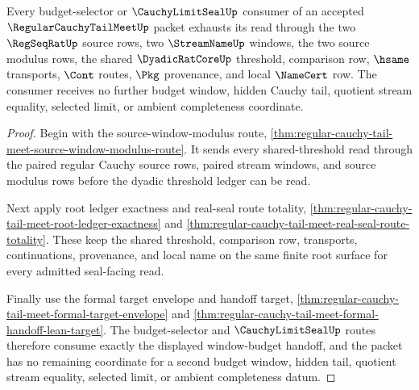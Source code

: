 \begin{theorem}
\label{thm:regular-cauchy-tail-meet-window-budget-exhaustion}
Every budget-selector or $\CauchyLimitSealUp$ consumer of an accepted $\RegularCauchyTailMeetUp$ packet exhausts its read through the two $\RegSeqRatUp$ source rows, two $\StreamNameUp$ windows, the two source modulus rows, the shared $\DyadicRatCoreUp$ threshold, comparison row, $\hsame$ transports, $\Cont$ routes, $\Pkg$ provenance, and local $\NameCert$ row. The consumer receives no further budget window, hidden Cauchy tail, quotient stream equality, selected limit, or ambient completeness coordinate.
\end{theorem}
\begin{proof}
Begin with the source-window-modulus route, \autoref{thm:regular-cauchy-tail-meet-source-window-modulus-route}. It sends every shared-threshold read through the paired regular Cauchy source rows, paired stream windows, and source modulus rows before the dyadic threshold ledger can be read.

Next apply root ledger exactness and real-seal route totality, \autoref{thm:regular-cauchy-tail-meet-root-ledger-exactness} and \autoref{thm:regular-cauchy-tail-meet-real-seal-route-totality}. These keep the shared threshold, comparison row, transports, continuations, provenance, and local name on the same finite root surface for every admitted seal-facing read.

Finally use the formal target envelope and handoff target, \autoref{thm:regular-cauchy-tail-meet-formal-target-envelope} and \autoref{thm:regular-cauchy-tail-meet-formal-handoff-lean-target}. The budget-selector and $\CauchyLimitSealUp$ routes therefore consume exactly the displayed window-budget handoff, and the packet has no remaining coordinate for a second budget window, hidden tail, quotient stream equality, selected limit, or ambient completeness datum.
\end{proof}

